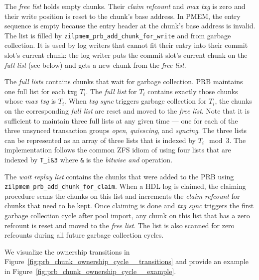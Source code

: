 \documentclass[12pt,a4paper,twoside]{book}
\begin{document}
\begin{description}[noitemsep]
    \item[Free List]
        The \textit{free list} holds empty chunks.
        Their \textit{claim refcount} and \textit{max txg} is zero and their write position is reset to the chunk's base address.
        In PMEM, the entry sequence is empty because the entry header at the chunk's base address is invalid.
        The list is filled by \lstinline{zilpmem_prb_add_chunk_for_write} and from garbage collection.
        It is used by log writers that cannot fit their entry into their commit slot's current chunk:
        the log writer puts the commit slot's current chunk on the \textit{full list} (see below) and gets a new chunk from the \textit{free list}.
    \item[Full Lists]
        The \textit{full lists} contains chunks that wait for garbage collection.
        PRB maintains one full list for each txg $T_i$. The \textit{full list} for $T_i$ contains exactly those chunks whose \textit{max txg} is $T_i$.
        When \textit{txg sync} triggers garbage collection for $T_i$, the chunks on the corresponding \textit{full list} are reset and moved to the \textit{free list}.
        Note that it is sufficient to maintain three full lists at any given time --- one for each of the three unsynced transaction groups \textit{open}, \textit{quiescing}, and \textit{syncing}.
        The three lists can be represented as an array of three lists that is indexed by $T_i \mod 3$.
        The implementation follows the common ZFS idiom of using four lists that are indexed by \lstinline{T_i&3} where \lstinline{&} is the \textit{bitwise and} operation.
    \item[Wait Replay List]
        The \textit{wait replay list} contains the chunks that were added to the PRB using \lstinline{zilpmem_prb_add_chunk_for_claim}.
        When a HDL log is claimed, the claiming procedure scans the chunks on this list and increments the \textit{claim refcount} for chunks that need to be kept.
        Once claiming is done and \textit{txg sync} triggers the first garbage collection cycle after pool import, any chunk on this list that has a zero refcount is reset and moved to the \textit{free list}.
        The list is also scanned for zero refcounts during all future garbage collection cycles.
\end{description}
We visualize the ownership transitions in Figure~\ref{fig:prb_chunk_ownership_cycle__transitions} and provide an example in Figure~\ref{fig:prb_chunk_ownership_cycle__example}.
\end{document}
